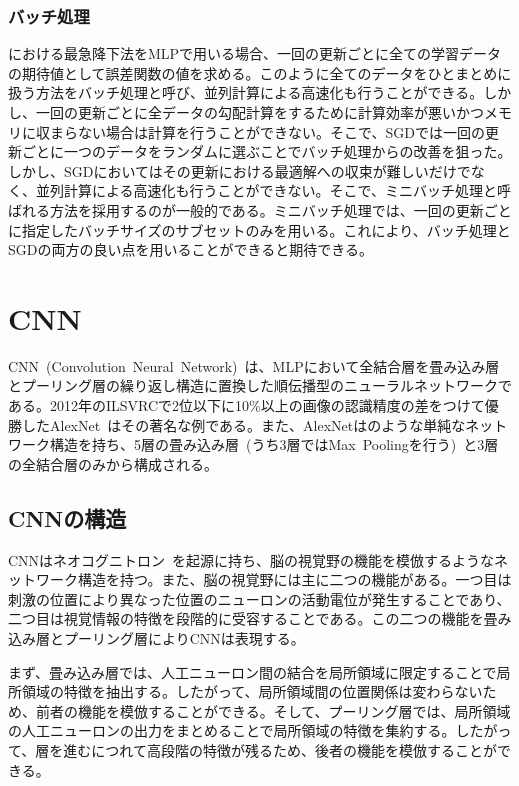\subsubsection{バッチ処理}

における最急降下法をMLPで用いる場合、一回の更新ごとに全ての学習データの期待値として誤差関数の値を求める。このように全てのデータをひとまとめに扱う方法をバッチ処理と呼び、並列計算による高速化も行うことができる。しかし、一回の更新ごとに全データの勾配計算をするために計算効率が悪いかつメモリに収まらない場合は計算を行うことができない。そこで、SGDでは一回の更新ごとに一つのデータをランダムに選ぶことでバッチ処理からの改善を狙った。しかし、SGDにおいてはその更新における最適解への収束が難しいだけでなく、並列計算による高速化も行うことができない。そこで、ミニバッチ処理と呼ばれる方法を採用するのが一般的である。ミニバッチ処理では、一回の更新ごとに指定したバッチサイズのサブセットのみを用いる。これにより、バッチ処理とSGDの両方の良い点を用いることができると期待できる。

\clearpage

\section{CNN}

CNN~(Convolution~Neural~Network)~は、MLPにおいて全結合層を畳み込み層とプーリング層の繰り返し構造に置換した順伝播型のニューラルネットワークである。2012年のILSVRCで2位以下に10\%以上の画像の認識精度の差をつけて優勝したAlexNet~\cite{AlexNet}はその著名な例である。また、AlexNetはのような単純なネットワーク構造を持ち、5層の畳み込み層~(うち3層ではMax~Poolingを行う)~と3層の全結合層のみから構成される。

\subsection{CNNの構造}

CNNはネオコグニトロン~\cite{neocognition}を起源に持ち、脳の視覚野の機能を模倣するようなネットワーク構造を持つ。また、脳の視覚野には主に二つの機能がある。一つ目は刺激の位置により異なった位置のニューロンの活動電位が発生することであり、二つ目は視覚情報の特徴を段階的に受容することである。この二つの機能を畳み込み層とプーリング層によりCNNは表現する。

まず、畳み込み層では、人工ニューロン間の結合を局所領域に限定することで局所領域の特徴を抽出する。したがって、局所領域間の位置関係は変わらないため、前者の機能を模倣することができる。そして、プーリング層では、局所領域の人工ニューロンの出力をまとめることで局所領域の特徴を集約する。したがって、層を進むにつれて高段階の特徴が残るため、後者の機能を模倣することができる。

